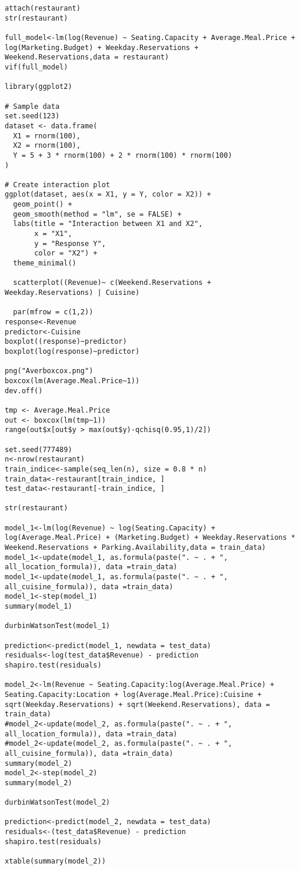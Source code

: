 \begin{lstlisting}
attach(restaurant)
str(restaurant)

full_model<-lm(log(Revenue) ~ Seating.Capacity + Average.Meal.Price + log(Marketing.Budget) + Weekday.Reservations + Weekend.Reservations,data = restaurant)
vif(full_model)

library(ggplot2)

# Sample data
set.seed(123)
dataset <- data.frame(
  X1 = rnorm(100),
  X2 = rnorm(100),
  Y = 5 + 3 * rnorm(100) + 2 * rnorm(100) * rnorm(100)
)

# Create interaction plot
ggplot(dataset, aes(x = X1, y = Y, color = X2)) +
  geom_point() +
  geom_smooth(method = "lm", se = FALSE) +
  labs(title = "Interaction between X1 and X2",
       x = "X1",
       y = "Response Y",
       color = "X2") +
  theme_minimal()

  scatterplot((Revenue)~ c(Weekend.Reservations + Weekday.Reservations) | Cuisine)

  par(mfrow = c(1,2))
response<-Revenue
predictor<-Cuisine
boxplot((response)~predictor)
boxplot(log(response)~predictor)

png("Averboxcox.png")
boxcox(lm(Average.Meal.Price~1))
dev.off()

tmp <- Average.Meal.Price
out <- boxcox(lm(tmp~1))
range(out$x[out$y > max(out$y)-qchisq(0.95,1)/2])

set.seed(777489)
n<-nrow(restaurant)
train_indice<-sample(seq_len(n), size = 0.8 * n)
train_data<-restaurant[train_indice, ]
test_data<-restaurant[-train_indice, ]

str(restaurant)

model_1<-lm(log(Revenue) ~ log(Seating.Capacity) + log(Average.Meal.Price) + (Marketing.Budget) + Weekday.Reservations * Weekend.Reservations + Parking.Availability,data = train_data)
model_1<-update(model_1, as.formula(paste(". ~ . + ", all_location_formula)), data =train_data)
model_1<-update(model_1, as.formula(paste(". ~ . + ", all_cuisine_formula)), data =train_data)
model_1<-step(model_1)
summary(model_1)

durbinWatsonTest(model_1)

prediction<-predict(model_1, newdata = test_data)
residuals<-log(test_data$Revenue) - prediction
shapiro.test(residuals)

model_2<-lm(Revenue ~ Seating.Capacity:log(Average.Meal.Price) + Seating.Capacity:Location + log(Average.Meal.Price):Cuisine + sqrt(Weekday.Reservations) + sqrt(Weekend.Reservations), data = train_data)
#model_2<-update(model_2, as.formula(paste(". ~ . + ", all_location_formula)), data =train_data)
#model_2<-update(model_2, as.formula(paste(". ~ . + ", all_cuisine_formula)), data =train_data)
summary(model_2)
model_2<-step(model_2)
summary(model_2)

durbinWatsonTest(model_2)

prediction<-predict(model_2, newdata = test_data)
residuals<-(test_data$Revenue) - prediction
shapiro.test(residuals)

xtable(summary(model_2))
\end{lstlisting}

